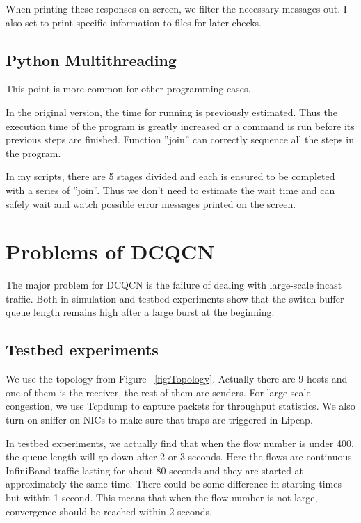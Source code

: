 \documentclass[12pt,a4paper]{article}
\begin{document}
When printing these responses on screen, we filter the necessary messages out.
I also set to print specific information to files for later checks.

\subsection{Python Multithreading}

This point is more common for other programming cases.

In the original version, the time for running is previously estimated.
Thus the execution time of the program is greatly increased or a command is run before its previous steps are finished.
Function ''join'' can correctly sequence all the steps in the program.

In my scripts, there are 5 stages divided and each is ensured to be completed with a series of ''join''.
Thus we don't need to estimate the wait time and can safely wait and watch possible error messages printed on the screen.


\section{Problems of DCQCN}

The major problem for DCQCN is the failure of dealing with large-scale incast traffic.
Both in simulation \cite{NS3} and testbed experiments show that the switch buffer queue length remains high
after a large burst at the beginning.

\subsection{Testbed experiments}

We use the topology from Figure ~\ref{fig:Topology}.
Actually there are 9 hosts and one of them is the receiver, the rest of them are senders.
For large-scale congestion, we use Tcpdump \cite{Tcpdump} to capture packets for throughput statistics.
We also turn on sniffer on NICs to make sure that traps are triggered in Lipcap.

In testbed experiments, we actually find that when the flow number is under 400, the queue length will go down after 2 or 3 seconds.
Here the flows are continuous InfiniBand traffic lasting for about 80 seconds and they are started at approximately the same time.
There could be some difference in starting times but within 1 second.
This means that when the flow number is not large, convergence should be reached within 2 seconds.
\end{document}
